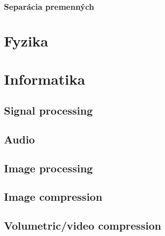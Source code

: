        \subsubsection{Separácia premenných}
        
         
\section{Fyzika}
    
    
    
\section{Informatika}
    \subsection{Signal processing}
    \subsection{Audio}
    \subsection{Image processing}
    \subsection{Image compression}
    \subsection{Volumetric/video compression}
     
